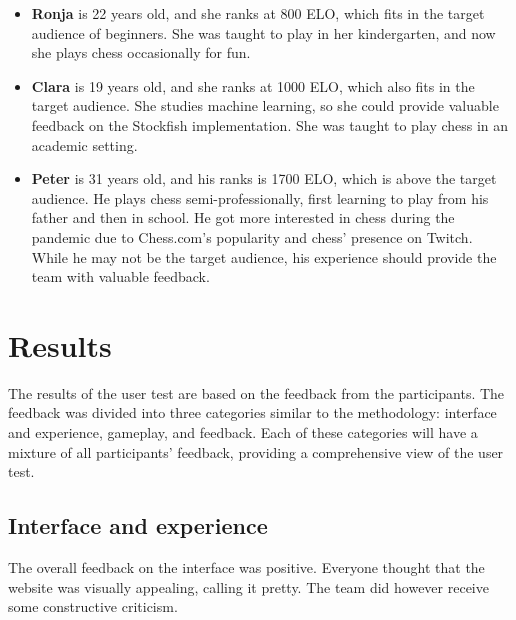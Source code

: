 \begin{itemize}

    \item \textbf{Ronja} is 22 years old, and she ranks at 800 ELO, which fits in the target audience of beginners.
    She was taught to play in her kindergarten, and now she plays chess occasionally for fun.

    \item \textbf{Clara} is 19 years old, and she ranks at 1000 ELO, which also fits in the target audience.
    She studies machine learning, so she could provide valuable feedback on the Stockfish implementation.
    She was taught to play chess in an academic setting.

    \item \textbf{Peter} is 31 years old, and his ranks is 1700 ELO, which is above the target audience.
    He plays chess semi-professionally, first learning to play from his father and then in school.
    He got more interested in chess during the pandemic due to Chess.com's popularity and chess' presence on Twitch.
    While he may not be the target audience, his experience should provide the team with valuable feedback.

\end{itemize}

\section{Results}\label{sec:results}

The results of the user test are based on the feedback from the participants.
The feedback was divided into three categories similar to the methodology: interface and experience, gameplay, and
feedback.
Each of these categories will have a mixture of all participants' feedback, providing a comprehensive view of the user
test.

\subsection{Interface and experience}\label{subsec:ui/ux}

The overall feedback on the interface was positive.
Everyone thought that the website was visually appealing, calling it pretty.
The team did however receive some constructive criticism.

